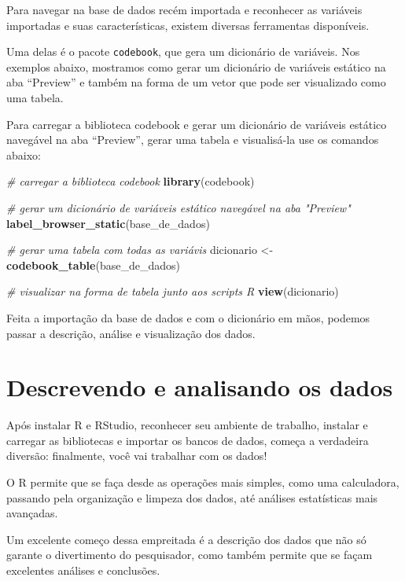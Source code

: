 \documentclass[
  10pt,
  brazil,
  a4paper,
  twoside, notitlepage, openright]{book}
\newenvironment{Shaded}{\begin{snugshade}}{\end{snugshade}}
\newcommand{\CommentTok}[1]{\textcolor[rgb]{0.56,0.35,0.01}{\textit{#1}}}
\newcommand{\KeywordTok}[1]{\textcolor[rgb]{0.13,0.29,0.53}{\textbf{#1}}}
\newcommand{\NormalTok}[1]{#1}
\newcommand{\StringTok}[1]{\textcolor[rgb]{0.31,0.60,0.02}{#1}}
\begin{document}
Para navegar na base de dados recém importada e reconhecer as variáveis importadas e suas características, existem diversas ferramentas disponíveis.

Uma delas é o pacote \texttt{codebook}, que gera um dicionário de variáveis. Nos exemplos abaixo, mostramos como gerar um dicionário de variáveis estático na aba ``Preview'' e também na forma de um vetor que pode ser visualizado como uma tabela.

Para carregar a biblioteca codebook e gerar um dicionário de variáveis estático navegável na aba ``Preview'', gerar uma tabela e visualisá-la use os comandos abaixo:

\begin{Shaded}
\begin{Highlighting}[]
\CommentTok{# carregar a biblioteca codebook}
\KeywordTok{library}\NormalTok{(codebook)}

\CommentTok{# gerar um dicionário de variáveis estático navegável na aba "Preview"}
\KeywordTok{label_browser_static}\NormalTok{(base_de_dados)}

\CommentTok{# gerar uma tabela com todas as variávis}
\NormalTok{dicionario <-}\StringTok{ }\KeywordTok{codebook_table}\NormalTok{(base_de_dados)}

\CommentTok{# visualizar na forma de tabela junto aos scripts R}
\KeywordTok{view}\NormalTok{(dicionario)}
\end{Highlighting}
\end{Shaded}

Feita a importação da base de dados e com o dicionário em mãos, podemos passar a descrição, análise e visualização dos dados.

\hypertarget{descrevendo-e-analisando-os-dados}{%
\chapter{Descrevendo e analisando os dados}\label{descrevendo-e-analisando-os-dados}}

Após instalar R e RStudio, reconhecer seu ambiente de trabalho, instalar e carregar as bibliotecas e importar os bancos de dados, começa a verdadeira diversão: finalmente, você vai trabalhar com os dados!

O R permite que se faça desde as operações mais simples, como uma calculadora, passando pela organização e limpeza dos dados, até análises estatísticas mais avançadas.

Um excelente começo dessa empreitada é a descrição dos dados que não só garante o divertimento do pesquisador, como também permite que se façam excelentes análises e conclusões.
\end{document}
